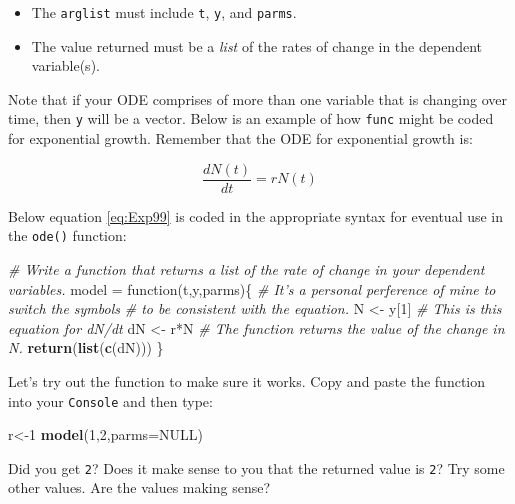 \documentclass[]{book}
\newenvironment{Shaded}{\begin{snugshade}}{\end{snugshade}}
\newcommand{\KeywordTok}[1]{\textcolor[rgb]{0.13,0.29,0.53}{\textbf{{#1}}}}
\newcommand{\DataTypeTok}[1]{\textcolor[rgb]{0.13,0.29,0.53}{{#1}}}
\newcommand{\DecValTok}[1]{\textcolor[rgb]{0.00,0.00,0.81}{{#1}}}
\newcommand{\StringTok}[1]{\textcolor[rgb]{0.31,0.60,0.02}{{#1}}}
\newcommand{\CommentTok}[1]{\textcolor[rgb]{0.56,0.35,0.01}{\textit{{#1}}}}
\newcommand{\OtherTok}[1]{\textcolor[rgb]{0.56,0.35,0.01}{{#1}}}
\newcommand{\NormalTok}[1]{{#1}}
\providecommand{\tightlist}{%
  \setlength{\itemsep}{0pt}\setlength{\parskip}{0pt}}
\begin{document}
\begin{itemize}
\tightlist
\item
  The \texttt{arglist} must include \texttt{t}, \texttt{y}, and
  \texttt{parms}.
\item
  The value returned must be a \emph{list} of the rates of change in the
  dependent variable(s).
\end{itemize}

Note that if your ODE comprises of more than one variable that is
changing over time, then \texttt{y} will be a vector. Below is an
example of how \texttt{func} might be coded for exponential growth.
Remember that the ODE for exponential growth is:

\begin{equation}
\frac{dN(t)}{dt} = rN(t) 
\label{eq:Exp99}
\end{equation}

Below equation \eqref{eq:Exp99} is coded in the appropriate syntax for
eventual use in the \texttt{ode()} function:

\begin{Shaded}
\begin{Highlighting}[]
\CommentTok{# Write a function that returns a list of the rate of change in your dependent variables.}
\NormalTok{model =}\StringTok{ }\NormalTok{function(t,y,parms)\{}
  \CommentTok{# It's a personal perference of mine to switch the symbols}
  \CommentTok{# to be consistent with the equation.}
  \NormalTok{N <-}\StringTok{ }\NormalTok{y[}\DecValTok{1}\NormalTok{]}
  \CommentTok{# This is this equation for dN/dt}
  \NormalTok{dN <-}\StringTok{ }\NormalTok{r*N}
  \CommentTok{# The function returns the value of the change in N.}
\KeywordTok{return}\NormalTok{(}\KeywordTok{list}\NormalTok{(}\KeywordTok{c}\NormalTok{(dN)))}
\NormalTok{\}}
\end{Highlighting}
\end{Shaded}

Let's try out the function to make sure it works. Copy and paste the
function into your \texttt{Console} and then type:

\begin{Shaded}
\begin{Highlighting}[]
\NormalTok{r<-}\DecValTok{1}
\KeywordTok{model}\NormalTok{(}\DecValTok{1}\NormalTok{,}\DecValTok{2}\NormalTok{,}\DataTypeTok{parms=}\OtherTok{NULL}\NormalTok{)}
\end{Highlighting}
\end{Shaded}

Did you get \texttt{2}? Does it make sense to you that the returned
value is \texttt{2}? Try some other values. Are the values making sense?
\end{document}
